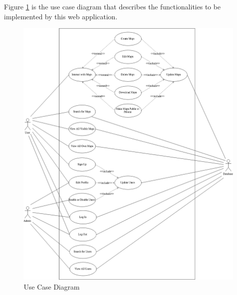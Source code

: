Figure \ref{Use Case Diagram} is the use case diagram that describes the functionalities to be implemented by this web application.

\begin{figure}[htbp]
\centering
\includegraphics[width=\textwidth]{section02/assets/use_case.png}
\caption[Use Case Diagram]{\label{Use Case Diagram}Use Case Diagram}
\end{figure}


